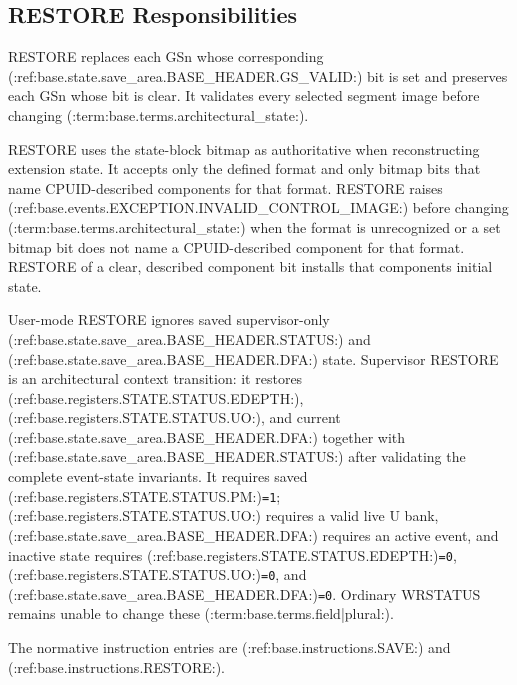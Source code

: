\subsection{RESTORE Responsibilities}
RESTORE replaces each GSn whose corresponding (:ref:base.state.save_area.BASE_HEADER.GS_VALID:) bit is set and preserves each GSn whose bit is
clear. It validates every selected segment image before changing (:term:base.terms.architectural_state:).

RESTORE uses the state-block bitmap as authoritative when reconstructing extension state. It accepts only the
defined format and only bitmap bits that name CPUID-described components for that format. RESTORE raises
(:ref:base.events.EXCEPTION.INVALID_CONTROL_IMAGE:) before changing (:term:base.terms.architectural_state:) when the format is unrecognized or a set
bitmap bit does not name a CPUID-described component for that format. RESTORE of a clear, described component bit
installs that component\textquotesingle{}s initial state.

User-mode RESTORE ignores saved supervisor-only (:ref:base.state.save_area.BASE_HEADER.STATUS:) and (:ref:base.state.save_area.BASE_HEADER.DFA:) state. Supervisor RESTORE is an architectural
context transition: it restores (:ref:base.registers.STATE.STATUS.EDEPTH:), (:ref:base.registers.STATE.STATUS.UO:), and current (:ref:base.state.save_area.BASE_HEADER.DFA:) together with (:ref:base.state.save_area.BASE_HEADER.STATUS:) after validating the complete
event-state invariants. It requires saved (:ref:base.registers.STATE.STATUS.PM:)\texttt{=1}; (:ref:base.registers.STATE.STATUS.UO:) requires a valid live U bank, (:ref:base.state.save_area.BASE_HEADER.DFA:) requires an active event, and
inactive state requires (:ref:base.registers.STATE.STATUS.EDEPTH:)\texttt{=0}, (:ref:base.registers.STATE.STATUS.UO:)\texttt{=0}, and (:ref:base.state.save_area.BASE_HEADER.DFA:)\texttt{=0}. Ordinary WRSTATUS remains unable to change these (:term:base.terms.field|plural:).

The normative instruction entries are
(:ref:base.instructions.SAVE:) and
(:ref:base.instructions.RESTORE:).\par

